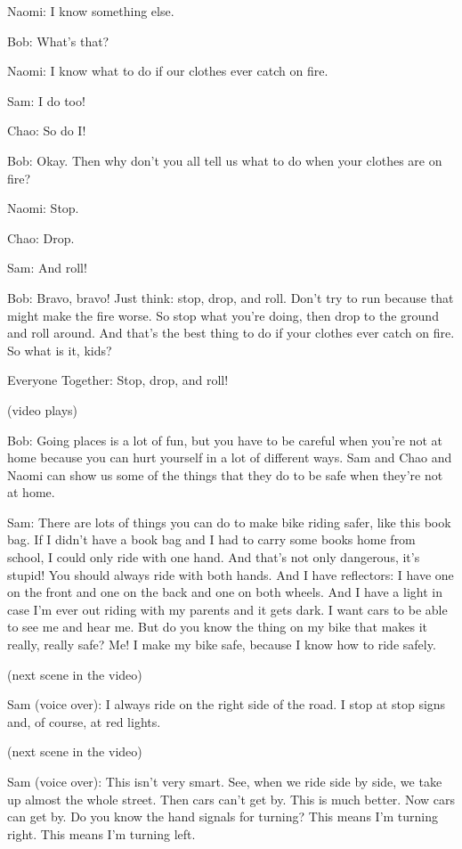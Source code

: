 Naomi: I know something else.

Bob: What's that?

Naomi: I know what to do if our clothes ever catch on fire.

Sam: I do too!

Chao: So do I!

Bob: Okay. Then why don't you all tell us what to do when your clothes are on fire?

Naomi: Stop.

Chao: Drop.

Sam: And roll!

Bob: Bravo, bravo! Just think: stop, drop, and roll. Don't try to run because that might make the fire worse. So stop what you're doing, then drop to the ground and roll around. And that's the best thing to do if your clothes ever catch on fire. So what is it, kids?

Everyone Together: Stop, drop, and roll!

(video plays)

Bob: Going places is a lot of fun, but you have to be careful when you're not at home because you can hurt yourself in a lot of different ways. Sam and Chao and Naomi can show us some of the things that they do to be safe when they're not at home.

Sam: There are lots of things you can do to make bike riding safer, like this book bag. If I didn't have a book bag and I had to carry some books home from school, I could only ride with one hand. And that's not only dangerous, it's stupid! You should always ride with both hands. And I have reflectors: I have one on the front and one on the back and one on both wheels. And I have a light in case I'm ever out riding with my parents and it gets dark. I want cars to be able to see me and hear me. But do you know the thing on my bike that makes it really, really safe? Me! I make my bike safe, because I know how to ride safely.

(next scene in the video)

Sam (voice over): I always ride on the right side of the road. I stop at stop signs and, of course, at red lights.

(next scene in the video)

Sam (voice over): This isn't very smart. See, when we ride side by side, we take up almost the whole street. Then cars can't get by. This is much better. Now cars can get by. Do you know the hand signals for turning? This means I'm turning right. This means I'm turning left.

